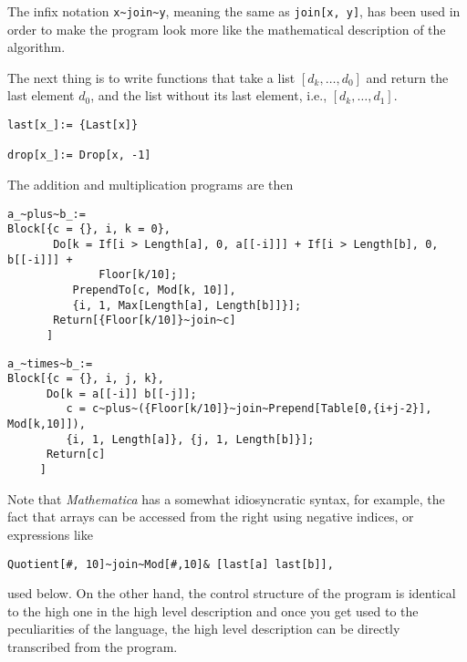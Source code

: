 \smallskip\noindent
The infix notation \verb+x~join~y+, meaning the 
same as \verb+join[x, y]+, has been used in order to make the 
program look more like the mathematical description of the algorithm.

The next thing is to write functions that take a list 
$[d_k,\ldots,d_0]$ and return the last element $d_0$, and the list
without its last element, i.e., $[d_k,\ldots,d_1]$. 

{\small
\begin{verbatim}
last[x_]:= {Last[x]}

drop[x_]:= Drop[x, -1]
\end{verbatim}
}

\noindent
The addition and multiplication programs are then

\begin{boxedtext}
\noindent
{\small
\begin{verbatim}
a_~plus~b_:= 
Block[{c = {}, i, k = 0},
       Do[k = If[i > Length[a], 0, a[[-i]]] + If[i > Length[b], 0, b[[-i]]] +
              Floor[k/10];
          PrependTo[c, Mod[k, 10]],
          {i, 1, Max[Length[a], Length[b]]}];
       Return[{Floor[k/10]}~join~c]
      ]
\end{verbatim}
}
\end{boxedtext}

\medskip
\begin{boxedtext}
\noindent
{\small 
\begin{verbatim}
a_~times~b_:= 
Block[{c = {}, i, j, k},
      Do[k = a[[-i]] b[[-j]]; 
         c = c~plus~({Floor[k/10]}~join~Prepend[Table[0,{i+j-2}], Mod[k,10]]),
         {i, 1, Length[a]}, {j, 1, Length[b]}];
      Return[c]
     ] 
\end{verbatim}
}
\end{boxedtext} 

\medskip\noindent
Note that {\sl Mathematica\/} has a somewhat idiosyncratic syntax, for
example, the fact that arrays can be accessed from the right using
negative indices, or expressions like 

\begin{verbatim}
Quotient[#, 10]~join~Mod[#,10]& [last[a] last[b]], 
\end{verbatim}

\noindent
used below. On the other hand, the control structure of the program is
identical to the high one in the high level description and once you
get used to the peculiarities of the language, the high level
description can be directly transcribed from the program.

